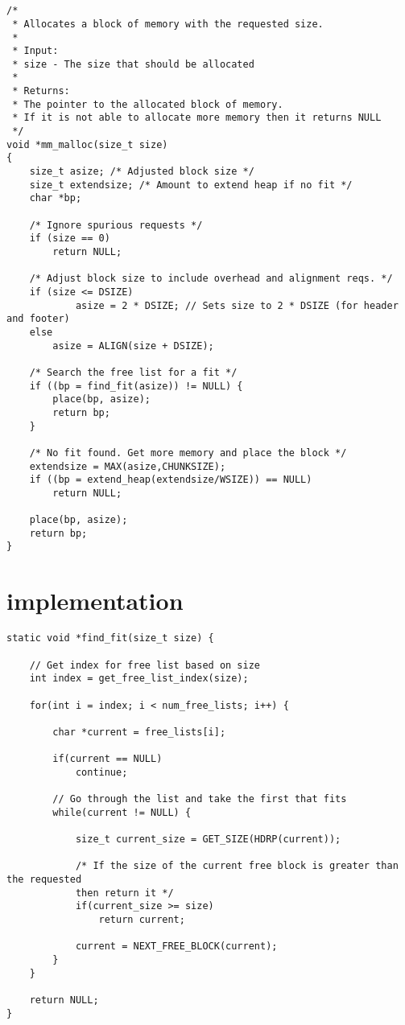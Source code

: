 \appendix


\section{} \label{appendix:malloc}
\begin{lstlisting}
/* 
 * Allocates a block of memory with the requested size.
 * 
 * Input:
 * size - The size that should be allocated
 * 
 * Returns:
 * The pointer to the allocated block of memory. 
 * If it is not able to allocate more memory then it returns NULL
 */
void *mm_malloc(size_t size)
{
    size_t asize; /* Adjusted block size */
    size_t extendsize; /* Amount to extend heap if no fit */
    char *bp;

    /* Ignore spurious requests */
    if (size == 0)
        return NULL;

    /* Adjust block size to include overhead and alignment reqs. */
    if (size <= DSIZE)
            asize = 2 * DSIZE; // Sets size to 2 * DSIZE (for header and footer)
    else
        asize = ALIGN(size + DSIZE); 

    /* Search the free list for a fit */
    if ((bp = find_fit(asize)) != NULL) {
        place(bp, asize);
        return bp; 
    }

    /* No fit found. Get more memory and place the block */
    extendsize = MAX(asize,CHUNKSIZE);
    if ((bp = extend_heap(extendsize/WSIZE)) == NULL)
        return NULL;

    place(bp, asize);
    return bp;
}
\end{lstlisting}

\section{ implementation} \label{appendix:find_fit}
\begin{lstlisting}
static void *find_fit(size_t size) {

    // Get index for free list based on size
    int index = get_free_list_index(size); 

    for(int i = index; i < num_free_lists; i++) {

        char *current = free_lists[i];

        if(current == NULL)
            continue;

        // Go through the list and take the first that fits
        while(current != NULL) {

            size_t current_size = GET_SIZE(HDRP(current)); 

            /* If the size of the current free block is greater than the requested
            then return it */ 
            if(current_size >= size)
                return current;
                
            current = NEXT_FREE_BLOCK(current);    
        }
    }

    return NULL;
}
\end{lstlisting}


